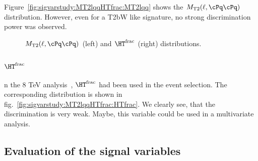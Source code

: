 Figure~\ref{fig:sigvarstudy:MT2lqqHTfrac:MT2lqq} shows the $\MTt(\ell,\cPq\cPq)$ distribution. However, even for a T2bW like signature, no strong discrimination power was observed.

\begin{figure}
\caption{\label{fig:sigvarstudy:MT2lqqHTfrac} $\MTt(\ell,\cPq\cPq)$ (left) and $\HT^\mathrm{frac}$ (right) distributions.}
\end{figure}

\subsubsection{$\HT^\mathrm{frac}$}

n the 8 TeV analysis~\cite{Chatrchyan:2013xna}, $\HT^\mathrm{frac}$ had been used in the event selection.
The corresponding distribution is shown in fig.~\ref{fig:sigvarstudy:MT2lqqHTfrac:HTfrac}. We clearly see, that the discrimination is very weak. Maybe, this variable could be used in a multivariate analysis.

\subsection{Evaluation of the signal variables}

